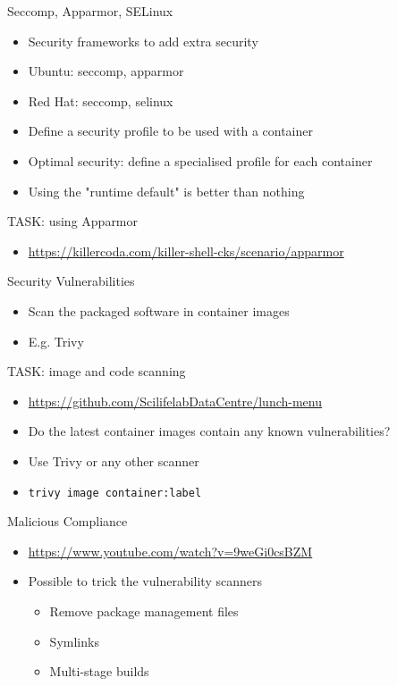 \documentclass{dcpresentation}
\begin{document}
\begin{frame}{Seccomp, Apparmor, SELinux}
  \begin{itemize}
  \item Security frameworks to add extra security
  \item Ubuntu: seccomp, apparmor
  \item Red Hat: seccomp, selinux
  \item Define a security profile to be used with a container
  \item Optimal security: define a specialised profile for each container
  \item Using the "runtime default" is better than nothing
  \end{itemize}
\end{frame}

\begin{frame}{TASK: using Apparmor}
 \begin{itemize}
  \item \url{https://killercoda.com/killer-shell-cks/scenario/apparmor}
 \end{itemize}
\end{frame}


\begin{frame}{Security Vulnerabilities}
  \begin{itemize}
  \item Scan the packaged software in container images
  \item E.g. Trivy
  \end{itemize}
\end{frame}


\begin{frame}{TASK: image and code scanning}
  \begin{itemize}
  \item \url{https://github.com/ScilifelabDataCentre/lunch-menu}
  \item Do the latest container images contain any known vulnerabilities?
  \item Use Trivy or any other scanner
  \item \texttt{trivy image container:label}
  \end{itemize}
\end{frame}


\begin{frame}{Malicious Compliance}
  \begin{itemize}
  \item \url{https://www.youtube.com/watch?v=9weGi0csBZM}
  \item Possible to trick the vulnerability scanners
  \begin{itemize}
  \item Remove package management files
  \item Symlinks
  \item Multi-stage builds
  \end{itemize} 
  \end{itemize}  
\end{frame}
\end{document}
